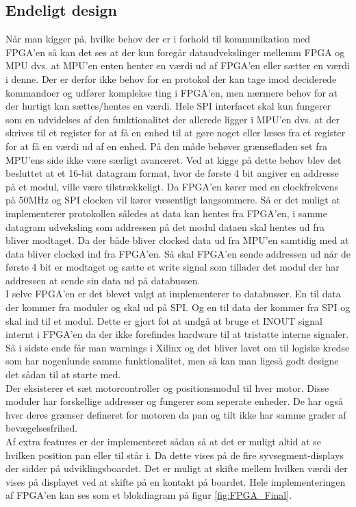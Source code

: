 \subsection{Endeligt design}
Når man kigger på, hvilke behov der er i forhold til kommunikation med FPGA'en så kan det ses at der kun foregår dataudvekslinger mellemm FPGA og MPU dvs. at MPU'en enten henter en værdi ud af FPGA'en eller sætter en værdi i denne. Der er derfor ikke behov for en protokol der kan tage imod deciderede kommandoer og udfører komplekse ting i FPGA'en, men nærmere behov for at der hurtigt kan sættes/hentes en værdi. Hele SPI interfacet skal kun fungerer som en udvidelses af den funktionalitet der allerede ligger i MPU'en dvs. at der skrives til et register for at få en enhed til at gøre noget eller læses fra et register for at få en værdi ud af en enhed. På den måde behøver grænsefladen set fra MPU'ens side ikke være særligt avanceret. Ved at kigge på dette behov blev det besluttet at et 16-bit datagram format, hvor de første 4 bit angiver en addresse på et modul, ville være tilstrækkeligt. Da FPGA'en kører med en clockfrekvens på 50MHz og SPI clocken vil kører væsentligt langsommere. Så er det muligt at implementerer protokollen således at data kan hentes fra FPGA'en, i samme datagram udveksling som addressen på det modul dataen skal hentes ud fra bliver modtaget. Da der både bliver clocked data ud fra MPU'en samtidig med at data bliver clocked ind fra FPGA'en. Så skal FPGA'en sende addressen ud når de første 4 bit er modtaget og sætte et write signal som tillader det modul der har addressen at sende sin data ud på databussen.\\
I selve FPGA'en er det blevet valgt at implementerer to databusser. En til data der kommer fra moduler og skal ud på SPI. Og en til data der kommer fra SPI og skal ind til et modul. Dette er gjort fot at undgå at bruge et INOUT signal internt i FPGA'en da der ikke forefindes hardware til at tristatte interne signaler. Så i sidste ende får man warnings i Xilinx og det bliver lavet om til logiske kredse som har nogenlunde samme funktionalitet, men så kan man ligeså godt designe det sådan til at starte med.\\
Der eksisterer et sæt motorcontroller og positionsmodul til hver motor. Disse moduler har forskellige addresser og fungerer som seperate enheder. De har også hver deres grænser defineret for motoren da pan og tilt ikke har samme grader af bevægelsesfrihed.\\
Af extra features er der implementeret sådan så at det er muligt altid at se hvilken position pan eller til står i. Da dette vises på de fire syvsegment-displays der sidder på udviklingsboardet. Det er muligt at skifte mellem hvilken værdi der vises på displayet ved at skifte på en kontakt på boardet. Hele implementeringen af FPGA'en kan ses som et blokdiagram på figur \ref{fig:FPGA_Final}.

